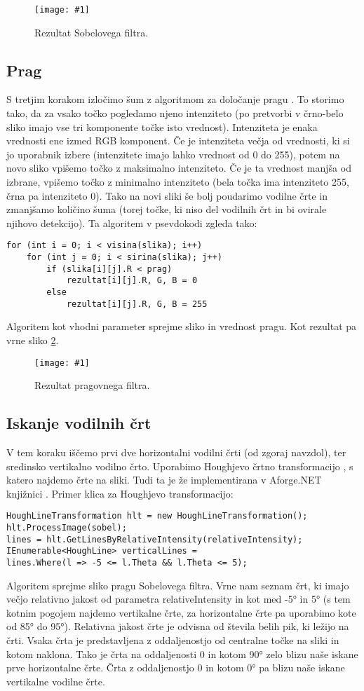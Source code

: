 \documentclass[oneside, a4paper, 12pt]{book}
\newcommand{\slika}[3]{
	\begin{figure}
	\begin{center}
	\texttt{[image: \#1]}
	\end{center}
	\vspace{-20pt}
	\caption{#2}
	\label{#3}
	\end{figure}
}
\begin{document}
\slika{slike/sobel.jpg}{Rezultat Sobelovega filtra.}{pic:sobel}

\subsection{Prag}
S tretjim korakom izločimo šum z algoritmom za določanje pragu \cite{treshold-wiki}. To storimo tako, da za vsako točko pogledamo njeno intenziteto (po pretvorbi v črno-belo sliko imajo vse tri komponente točke isto vrednost). Intenziteta je enaka vrednosti ene izmed RGB komponent. Če je intenziteta večja od vrednosti, ki si jo uporabnik izbere (intenzitete imajo lahko vrednost od 0 do 255), potem na novo sliko vpišemo točko z maksimalno intenziteto. Če je ta vrednost manjša od izbrane, vpišemo točko z minimalno intenziteto (bela točka ima intenziteto 255, črna pa intenziteto 0). Tako na novi sliki še bolj poudarimo vodilne črte in zmanjšamo količino šuma (torej točke, ki niso del vodilnih črt in bi ovirale njihovo detekcijo). Ta algoritem v psevdokodi zgleda tako:
\begin{samepage}
\begin{verbatim}
for (int i = 0; i < visina(slika); i++)
    for (int j = 0; i < sirina(slika); j++)
        if (slika[i][j].R < prag)
            rezultat[i][j].R, G, B = 0
        else
            rezultat[i][j].R, G, B = 255
\end{verbatim}
\end{samepage}
Algoritem kot vhodni parameter sprejme sliko in vrednost pragu. Kot rezultat pa vrne sliko \ref{pic:treshold}.

\slika{slike/treshold.jpg}{Rezultat pragovnega filtra.}{pic:treshold}


\subsection{Iskanje vodilnih črt}
V tem koraku iščemo prvi dve horizontalni vodilni črti (od zgoraj navzdol), ter sredinsko vertikalno vodilno črto. Uporabimo Houghjevo črtno transformacijo \cite{hough-wiki}, s katero najdemo črte na sliki. Tudi ta je že implementirana v Aforge.NET knjižnici \cite{hough}. Primer klica za Houghjevo transformacijo:
\begin{samepage}
\begin{verbatim}
HoughLineTransformation hlt = new HoughLineTransformation();
hlt.ProcessImage(sobel);
lines = hlt.GetLinesByRelativeIntensity(relativeIntensity);
IEnumerable<HoughLine> verticalLines = 
lines.Where(l => -5 <= l.Theta && l.Theta <= 5);
\end{verbatim}
\end{samepage}
Algoritem sprejme sliko pragu Sobelovega filtra. Vrne nam seznam črt, ki imajo večjo relativno jakost od parametra relativeIntensity in kot med -5° in 5° (s tem kotnim pogojem najdemo vertikalne črte, za horizontalne črte pa uporabimo kote od 85° do 95°). Relativna jakost črte je odvisna od števila belih pik, ki ležijo na črti. Vsaka črta je predstavljena z oddaljenostjo od centralne točke na sliki in kotom naklona. Tako je črta na oddaljenosti 0 in kotom 90° zelo blizu naše iskane prve horizontalne črte. Črta z oddaljenostjo 0 in kotom 0° pa blizu naše iskane vertikalne vodilne črte. \cite{hough} 
\end{document}
